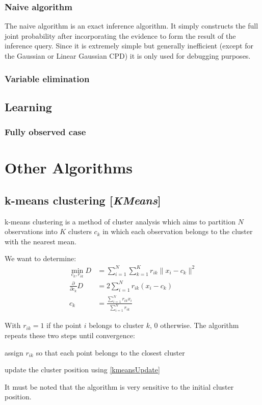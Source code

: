 \documentclass[11pt]{article}
\newcommand{\nllref}[1]{[\small{\textit{#1}}]}
\newcommand{\norm}[1]{\| #1 \|}
\begin{document}
\subsubsection{Naive algorithm}
The naive algorithm is an exact inference algorithm. It simply constructs the full joint probability after incorporating the evidence to form the result of the inference query. Since it is extremely simple but generally inefficient (except for the Gaussian or Linear Gaussian CPD) it is only used for debugging purposes.

\subsubsection{Variable elimination}
\subsection{Learning}
\subsubsection{Fully observed case}

\section{Other Algorithms}
\subsection{k-means clustering \nllref{KMeans}}
k-means clustering is a method of cluster analysis which aims to partition $N$ observations into $K$ clusters $c_k$ in which each observation belongs to the cluster with the nearest mean.

We want to determine:
\begin{align}
\min_{c_k,r_{ik}} D &= \sum_{i=1}^N\sum_{k=1}^K r_{ik} \norm{x_i-c_k}^2\nonumber\\
\frac{\partial}{\partial c_k}D &= 2 \sum_{i=1}^Nr_{ik}(x_i-c_k) \nonumber\\
c_k &= \frac{\sum_{i=1}^N r_{ik}x_i}{\sum_{i=1}^N r_{ik}} \label{kmeansUpdate}
\end{align}

With $r_{ik}=1$ if the point $i$ belongs to cluster $k$, 0 otherwise. The algorithm repeats these two steps until convergence:
\begin{compactitem}
\item assign $r_{ik}$ so that each point belongs to the closest cluster
\item update the cluster position using \ref{kmeansUpdate}
\end{compactitem}
It must be noted that the algorithm is very sensitive to the initial cluster position.
\end{document}
